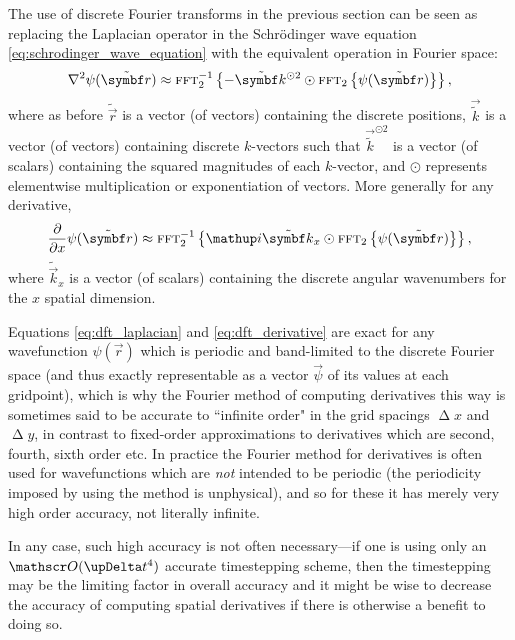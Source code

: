 The use of discrete Fourier transforms in the previous section can be seen as replacing the Laplacian operator in the Schr\"odinger wave equation \eqref{eq:schrodinger_wave_equation} with the equivalent operation in Fourier space:
\begin{align}\label{eq:dft_laplacian}
\nabla^2\psi(\tilde{\vec r}) \approx \fft_2^{-1}\left\{-\tilde{\vec k}^{\odot 2} \odot \fft_2\left\{\psi(\tilde{\vec r})\right\}\right\},
\end{align}
where as before $\tilde{\vec r}$ is a vector (of vectors) containing the discrete positions, $\vec{\tilde k}$ is a vector (of vectors) containing discrete $k$-vectors such that $\vec{\tilde k}^{\odot 2}$ is a vector (of scalars) containing the squared magnitudes of each $k$-vector, and $\odot$ represents elementwise multiplication or exponentiation of vectors. More generally for any derivative,
\begin{align}\label{eq:dft_derivative}
\pdv{x}\psi(\tilde{\vec r}) \approx \fft_2^{-1}\left\{\ii\tilde{\vec k}_x \odot \fft_2\left\{\psi(\tilde{\vec r})\right\}\right\},
\end{align}
where $\tilde{\vec k}_x$ is a vector (of scalars) containing the discrete angular wavenumbers for the $x$ spatial dimension.

Equations \eqref{eq:dft_laplacian} and \eqref{eq:dft_derivative} are exact for any wavefunction $\psi(\vec r)$ which is periodic and band-limited to the discrete Fourier space (and thus exactly representable as a vector $\vec \psi$ of its values at each gridpoint), which is why the Fourier method of computing derivatives this way is sometimes said to be accurate to ``infinite order" \cite{fornberg_pseudospectral_1987} in the grid spacings $\upDelta x$ and $\upDelta y$, in contrast to fixed-order approximations to derivatives which are second, fourth, sixth order etc. In practice the Fourier method for derivatives is often used for wavefunctions which are \emph{not} intended to be periodic (the periodicity imposed by using the method is unphysical), and so for these it has merely very high order accuracy, not literally infinite. 

In any case, such high accuracy is not often necessary---if one is using only an $\Ord{\upDelta t^4}$ accurate timestepping scheme, then the timestepping may be the limiting factor in overall accuracy and it might be wise to decrease the accuracy of computing spatial derivatives if there is otherwise a benefit to doing so.


